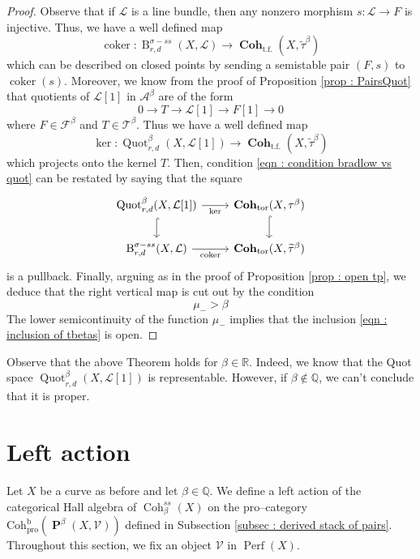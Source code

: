 \documentclass[11pt]{article}
\newcommand{\BR}{\mathbb{R}}
\newcommand{\BQ}{\mathbb{Q}}
\newcommand{\pro}{\operatorname{Coh^b_{pro}}}
\newcommand{\fbeta}{\mathcal{F}^{\beta}}
\newcommand{\tbeta}{\mathcal{T}^{\beta}}
\newcommand{\abeta}{\mathcal{A}^{\beta}}
\newcommand{\cohbetass}{\operatorname{Coh}^{ss}_{\beta}(X)}
\newcommand{\perf}{\operatorname{Perf}(X)}
\newcommand{\cohflat}{\boldsymbol{\operatorname{Coh}}}
\newcommand{\framing}{\mathcal{V}}
\newcommand{\linebundle}{\mathcal{L}}
\newcommand{\pairs}{\boldsymbol{\operatorname{P}}^{\beta}(X,\mathcal{V})}
\newcommand{\Quotbetaonerd}{\operatorname{Quot}_{r,d}^{\beta}(X,\mathcal{L}[1])}
\newcommand{\bradlb}{\operatorname{{B}}^{\sigma - ss}_{r,d}(X,\mathcal{L})}
\begin{document}
\begin{proof}
    \noindent Observe that if $\linebundle$ is a line bundle, then any nonzero morphism $s \colon \linebundle \rightarrow F$ is injective. Thus, we have a well defined map
    \begin{equation}\label{eqn : coker map for bradlow pairs}
        \operatorname{coker} \colon \bradlb \longrightarrow \cohflat_{\operatorname{t.f.}}(X,\widetilde{\tau}^{\beta})
    \end{equation}
     which can be described on closed points by sending a semistable pair $(F,s)$ to $\operatorname{coker}(s)$. Moreover, we know from the proof of Proposition \eqref{prop : PairsQuot} that quotients of $\linebundle[1]$ in $\abeta$ are of the form
    \[
        0\rightarrow T \rightarrow \linebundle [1] \rightarrow F[1] \rightarrow 0
    \]
    where $F \in \fbeta$ and $T\in \tbeta$. Thus we have a well defined map
      \begin{equation}\label{eqn : ker map for quot}
        \operatorname{ker} \colon \Quotbetaonerd \longrightarrow \cohflat_{\operatorname{t.f.}}(X,\widetilde{\tau}^{\beta})
    \end{equation}
    which projects onto the kernel $T$. Then, condition \eqref{eqn : condition bradlow vs quot} can be restated by saying that the square
\[\begin{tikzcd}
	\Quotbetaonerd & {\cohflat_{\operatorname{tor}}(X,{\tau}^{\beta})} \\
	\bradlb & {\cohflat_{\operatorname{tor}}(X,\widetilde{\tau}^{\beta})}
	\arrow["{\operatorname{ker}}"',from=1-1, to=1-2]
	\arrow[hook, from=1-1, to=2-1]
	\arrow[hook, from=1-2, to=2-2]
	\arrow["{\operatorname{coker}}"', from=2-1, to=2-2]
\end{tikzcd}\]
is a pullback. Finally, arguing as in the proof of Proposition \ref{prop : open tp}, we deduce that the right vertical map is cut out by the condition 
    \[
        \mu_- > \beta
    \]
    The lower semicontinuity of the function $\mu_-$ implies that the inclusion \eqref{eqn : inclusion of tbetas} is open. 
\end{proof}
\noindent Observe that the above Theorem holds for $\beta \in \BR$. Indeed, we know that the Quot space $\Quotbetaonerd$ is representable. However, if $\beta \notin \BQ$, we can't conclude that it is proper.


\section{Left action}
Let $X$ be a curve as before and let $\beta \in \BQ$. We define a left action of the categorical Hall algebra of $\cohbetass$ on the pro--category $\pro(\pairs)$ defined in Subsection \ref{subsec : derived stack of pairs}. Throughout this section, we fix an object $\framing$ in $\perf$.
\end{document}
